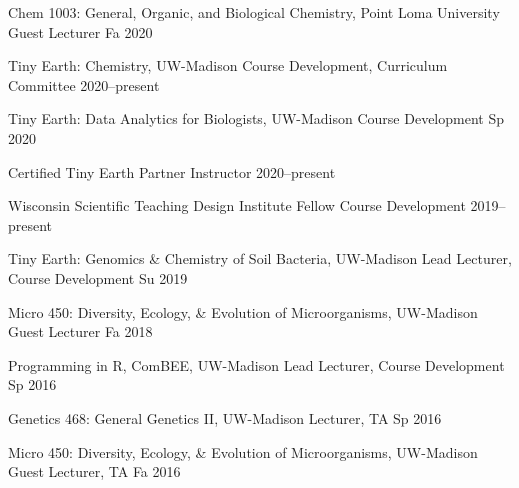 

\begin{cvhonors}

\cvhonor
{Chem 1003: General, Organic, and Biological Chemistry, Point Loma University}
{Guest Lecturer}
{Fa 2020}

\cvhonor
{Tiny Earth: Chemistry, UW-Madison}
{Course Development, Curriculum Committee}
{2020--present}

\cvhonor
{Tiny Earth: Data Analytics for Biologists, UW-Madison}
{Course Development}
{Sp 2020}

\cvhonor
{Certified Tiny Earth Partner Instructor}
{}
{2020--present}

\cvhonor
{Wisconsin Scientific Teaching Design Institute Fellow}
{Course Development}
{2019--present}

\cvhonor
{Tiny Earth: Genomics \& Chemistry of Soil Bacteria, UW-Madison}
{Lead Lecturer, Course Development}
{Su 2019}

\cvhonor
{Micro 450: Diversity, Ecology, \& Evolution of Microorganisms, UW-Madison}
{Guest Lecturer}
{Fa 2018}

\cvhonor
{Programming in R, ComBEE, UW-Madison}
{Lead Lecturer, Course Development}
{Sp 2016}

\cvhonor
{Genetics 468: General Genetics II, UW-Madison}
{Lecturer, TA}
{Sp 2016}

\cvhonor
{Micro 450: Diversity, Ecology, \& Evolution of Microorganisms, UW-Madison}
{Guest Lecturer, TA}
{Fa 2016}

\end{cvhonors}